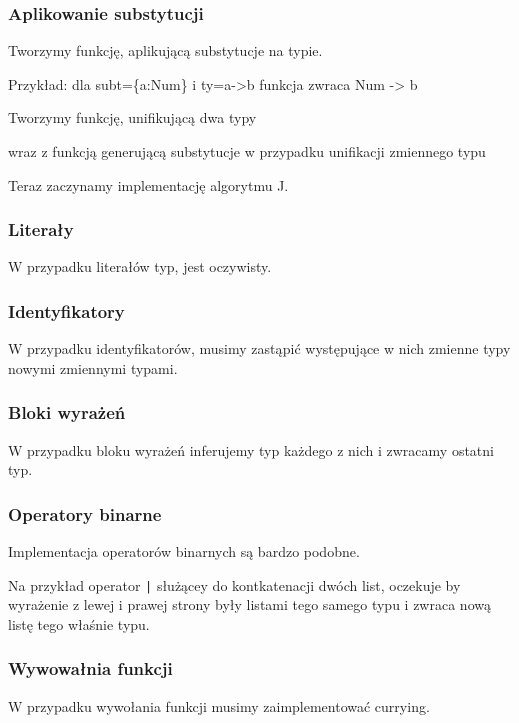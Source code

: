 \documentclass{article}
\begin{document}
\subsubsection{Aplikowanie substytucji}
Tworzymy funkcję, aplikującą substytucje na typie.

Przykład: dla subt=\{a:Num\} i ty=a->b funkcja zwraca Num -> b

Tworzymy funkcję, unifikującą dwa typy

wraz z funkcją generującą substytucje w przypadku unifikacji zmiennego typu

Teraz zaczynamy implementację algorytmu J.

\subsubsection{Literały}
W przypadku literałów typ, jest oczywisty.

\subsubsection{Identyfikatory}
W przypadku identyfikatorów, musimy zastąpić występujące w nich zmienne typy nowymi zmiennymi typami.

\subsubsection{Bloki wyrażeń}
W przypadku bloku wyrażeń inferujemy typ każdego z nich i zwracamy ostatni typ.


\subsubsection{Operatory binarne}
Implementacja operatorów binarnych są bardzo podobne.

Na przykład operator \lstinline{|} służącey do kontkatenacji dwóch list, oczekuje by wyrażenie z lewej i prawej strony były listami tego samego typu i zwraca nową listę tego właśnie typu.\newpage

\subsubsection{Wywowałnia funkcji}
W przypadku wywołania funkcji musimy zaimplementować currying.
\end{document}
